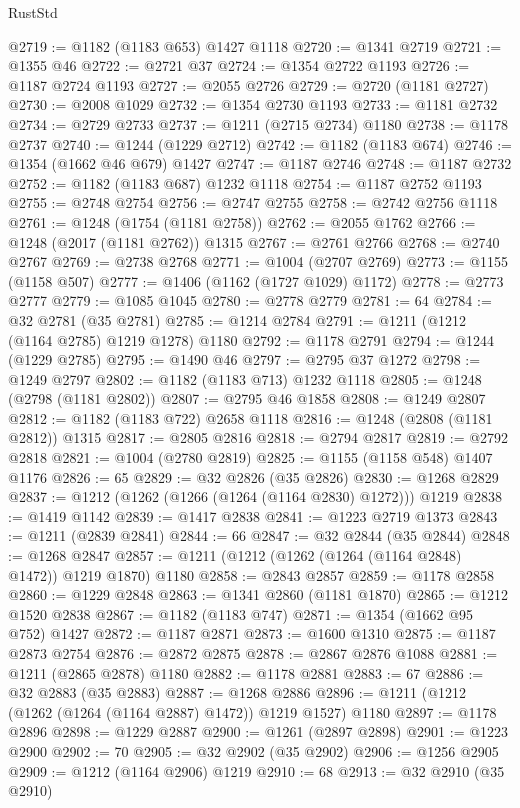 \begin{lexlean}{RustStd}
\begin{coremodule}
{\begin{coremodule}
{{{{{{{{{{{{{{{{{{{{{{{{{{{{{{{{@2719 := @1182 (@1183 @653) @1427 @1118
@2720 := @1341 @2719
@2721 := @1355 @46
@2722 := @2721 @37
@2724 := @1354 @2722 @1193
@2726 := @1187 @2724 @1193
@2727 := @2055 @2726
@2729 := @2720 (@1181 @2727)
@2730 := @2008 @1029
@2732 := @1354 @2730 @1193
@2733 := @1181 @2732
@2734 := @2729 @2733
@2737 := @1211 (@2715 @2734) @1180
@2738 := @1178 @2737
@2740 := @1244 (@1229 @2712)
@2742 := @1182 (@1183 @674)
@2746 := @1354 (@1662 @46 @679) @1427
@2747 := @1187 @2746
@2748 := @1187 @2732
@2752 := @1182 (@1183 @687) @1232 @1118
@2754 := @1187 @2752 @1193
@2755 := @2748 @2754
@2756 := @2747 @2755
@2758 := @2742 @2756 @1118
@2761 := @1248 (@1754 (@1181 @2758))
@2762 := @2055 @1762
@2766 := @1248 (@2017 (@1181 @2762)) @1315
@2767 := @2761 @2766
@2768 := @2740 @2767
@2769 := @2738 @2768
@2771 := @1004 (@2707 @2769)
@2773 := @1155 (@1158 @507)
@2777 := @1406 (@1162 (@1727 @1029) @1172)
@2778 := @2773 @2777
@2779 := @1085 @1045
@2780 := @2778 @2779
@2781 := 64
@2784 := @32 @2781 (@35 @2781)
@2785 := @1214 @2784
@2791 := @1211 (@1212 (@1164 @2785) @1219 @1278) @1180
@2792 := @1178 @2791
@2794 := @1244 (@1229 @2785)
@2795 := @1490 @46
@2797 := @2795 @37 @1272
@2798 := @1249 @2797
@2802 := @1182 (@1183 @713) @1232 @1118
@2805 := @1248 (@2798 (@1181 @2802))
@2807 := @2795 @46 @1858
@2808 := @1249 @2807
@2812 := @1182 (@1183 @722) @2658 @1118
@2816 := @1248 (@2808 (@1181 @2812)) @1315
@2817 := @2805 @2816
@2818 := @2794 @2817
@2819 := @2792 @2818
@2821 := @1004 (@2780 @2819)
@2825 := @1155 (@1158 @548) @1407 @1176
@2826 := 65
@2829 := @32 @2826 (@35 @2826)
@2830 := @1268 @2829
@2837 := @1212 (@1262 (@1266 (@1264 (@1164 @2830) @1272))) @1219
@2838 := @1419 @1142
@2839 := @1417 @2838
@2841 := @1223 @2719 @1373
@2843 := @1211 (@2839 @2841)
@2844 := 66
@2847 := @32 @2844 (@35 @2844)
@2848 := @1268 @2847
@2857 := @1211 (@1212 (@1262 (@1264 (@1164 @2848) @1472)) @1219 @1870) @1180
@2858 := @2843 @2857
@2859 := @1178 @2858
@2860 := @1229 @2848
@2863 := @1341 @2860 (@1181 @1870)
@2865 := @1212 @1520 @2838
@2867 := @1182 (@1183 @747)
@2871 := @1354 (@1662 @95 @752) @1427
@2872 := @1187 @2871
@2873 := @1600 @1310
@2875 := @1187 @2873 @2754
@2876 := @2872 @2875
@2878 := @2867 @2876 @1088
@2881 := @1211 (@2865 @2878) @1180
@2882 := @1178 @2881
@2883 := 67
@2886 := @32 @2883 (@35 @2883)
@2887 := @1268 @2886
@2896 := @1211 (@1212 (@1262 (@1264 (@1164 @2887) @1472)) @1219 @1527) @1180
@2897 := @1178 @2896
@2898 := @1229 @2887
@2900 := @1261 (@2897 @2898)
@2901 := @1223 @2900
@2902 := 70
@2905 := @32 @2902 (@35 @2902)
@2906 := @1256 @2905
@2909 := @1212 (@1164 @2906) @1219
@2910 := 68
@2913 := @32 @2910 (@35 @2910)
}}}}}}}}}}}}}}}}}}}}}}}}}}}}}}}}
\end{coremodule}}
\end{coremodule}
\end{lexlean}
